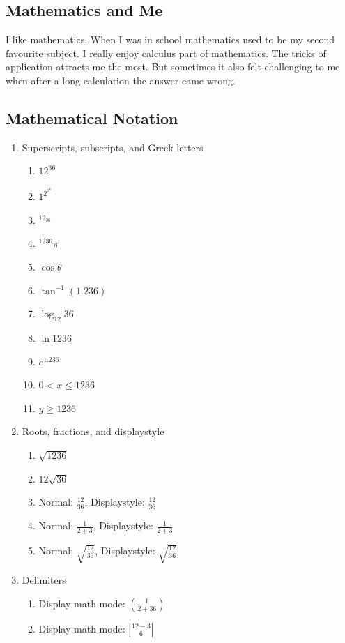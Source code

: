 \documentclass[12pt]{article}
\begin{document}
\subsection{Mathematics and Me}
I like mathematics. When I was in school mathematics used to be my second favourite subject. I really enjoy calculus part of mathematics. The tricks of application attracts me the most. But sometimes it also felt challenging to me when after a long calculation the answer came wrong.
\subsection{Mathematical Notation}
\begin{enumerate}
    \item Superscripts, subscripts, and Greek letters
    \begin{enumerate}
        \item $12^{36}$
        \item $1^{2^{3^6}}$
        \item $^{12_{36}}$
        \item $^{1236}{\pi}$
        \item $\cos \theta$
        \item $\tan^{-1}(1.236)$
        \item $\log_{12} 36$
        \item $\ln 1236$
        \item $e^{1.236}$
        \item $0 < x \leq 1236$
        \item $y \geq 1236$
    \end{enumerate}
    \item Roots, fractions, and displaystyle
    \begin{enumerate}
        \item $\sqrt{1236}$
        \item $12\sqrt{36}$
        \item Normal: $\frac{12}{36}$, Displaystyle: $\displaystyle\frac{12}{36}$
        \item Normal: $\frac{1}{2+3}$, Displaystyle: $\displaystyle\frac{1}{2+3}$
        \item Normal: $\sqrt{\frac{12}{36}}$, Displaystyle: $\displaystyle\sqrt{\frac{12}{36}}$
    \end{enumerate}

    \item Delimiters
    \begin{enumerate}
        \item Display math mode: $\left(\frac{1}{2+36}\right)$
        \item Display math mode: $\left|\frac{12-3}{6}\right|$
    \end{enumerate}


\end{enumerate}
\end{document}

